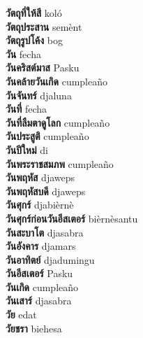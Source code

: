\textbf{ วัตถุที่ให้สี  } koló \\
\textbf{ วัตถุประสาน  } semènt \\
\textbf{ วัตถุรูปโค้ง  } bog \\
\textbf{ วัน  } fecha \\
\textbf{ วันคริสต์มาส  } Pasku \\
\textbf{ วันคล้ายวันเกิด  } cumpleaño \\
\textbf{ วันจันทร์  } djaluna \\
\textbf{ วันที่  } fecha \\
\textbf{ วันที่ลืมตาดูโลก  } cumpleaño \\
\textbf{ วันประสูติ  } cumpleaño \\
\textbf{ วันปีใหม่  } di \\
\textbf{ วันพระราชสมภพ  } cumpleaño \\
\textbf{ วันพฤหัส  } djaweps \\
\textbf{ วันพฤหัสบดี  } djaweps \\
\textbf{ วันศุกร์  } djabièrnè \\
\textbf{ วันศุกร์ก่อนวันอีสเตอร์  } bièrnèsantu \\
\textbf{ วันสะบาโต  } djasabra \\
\textbf{ วันอังคาร  } djamars \\
\textbf{ วันอาทิตย์  } djadumingu \\
\textbf{ วันอีสเตอร์  } Pasku \\
\textbf{ วันเกิด  } cumpleaño \\
\textbf{ วันเสาร์  } djasabra \\
\textbf{ วัย  } edat \\
\textbf{ วัยชรา  } biehesa \\
